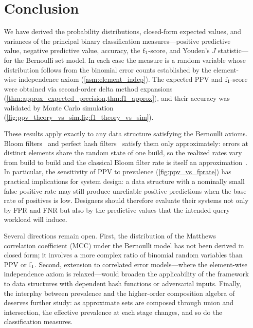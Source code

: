 
\section{Conclusion}
\label{sec:conclusion_cm}

We have derived the probability distributions, closed-form expected values, and variances of the principal binary classification measures---positive predictive value, negative predictive value, accuracy, the $\mathrm{f}_1$-score, and Youden's $J$ statistic---for the Bernoulli set model.
In each case the measure is a random variable whose distribution follows from the binomial error counts established by the element-wise independence axiom (\cref{asm:element_indep}).
The expected PPV and $\mathrm{f}_1$-score were obtained via second-order delta method expansions (\cref{thm:approx_expected_precision,thm:f1_approx}), and their accuracy was validated by Monte Carlo simulation (\cref{fig:ppv_theory_vs_sim,fig:f1_theory_vs_sim}).

These results apply exactly to any data structure satisfying the Bernoulli axioms. Bloom filters~\cite{bf} and perfect hash filters~\cite{phf} satisfy them only approximately: errors at distinct elements share the random state of one build, so the realized rates vary from build to build and the classical Bloom filter rate is itself an approximation~\cite{bose2008fpr}.
In particular, the sensitivity of PPV to prevalence (\cref{fig:ppv_vs_fprate}) has practical implications for system design: a data structure with a nominally small false positive rate may still produce unreliable positive predictions when the base rate of positives is low.
Designers should therefore evaluate their systems not only by FPR and FNR but also by the predictive values that the intended query workload will induce.

Several directions remain open.
First, the distribution of the Matthews correlation coefficient (MCC) under the Bernoulli model has not been derived in closed form; it involves a more complex ratio of binomial random variables than PPV or $\mathrm{f}_1$.
Second, extension to correlated error models---where the element-wise independence axiom is relaxed---would broaden the applicability of the framework to data structures with dependent hash functions or adversarial inputs.
Finally, the interplay between prevalence and the higher-order composition algebra of~\cite{bernoulliSets,bernoulliComposition} deserves further study: as approximate sets are composed through union and intersection, the effective prevalence at each stage changes, and so do the classification measures.
